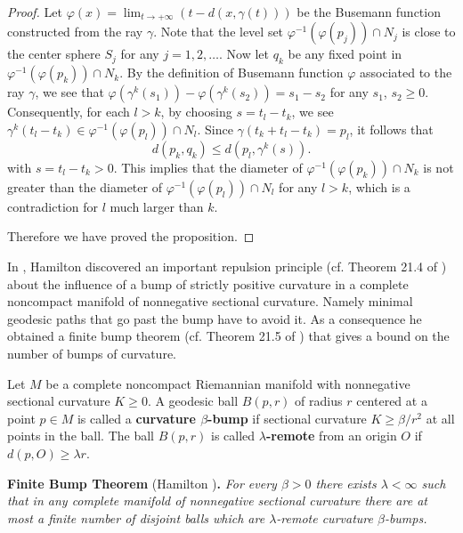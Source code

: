 \begin{proof}
Let $\varphi(x)=\lim_{t\rightarrow+\infty}(t-d(x,\gamma(t)))$ be
the Busemann function constructed from the ray $\gamma$. Note that
the level set $\varphi^{-1}(\varphi(p_{j}))\cap N_j$ is close to
the center sphere $S_j$ for any $j = 1, 2, \ldots$. Now let $q_k$
be any fixed point in $\varphi^{-1}(\varphi(p_{k}))\cap N_k$. By
the definition of Busemann function $\varphi$ associated to the
ray $\gamma$, we see that
$\varphi(\gamma^{k}(s_1))-\varphi(\gamma^{k}(s_2))=s_1-s_2$ for
any $s_1$, $s_2\geq0$. Consequently, for each $l>k$, by choosing
$s=t_l-t_k$, we see $\gamma^{k}(t_l-t_k)\in
\varphi^{-1}(\varphi(p_{l}))\cap N_l.$ Since
$\gamma(t_k+t_l-t_k)=p_{l}$, it follows that
$$
d(p_{k},q_{k})\leq d(p_{l},\gamma^{k}(s)).
$$
with $s =t_l-t_k >0$. This implies that the diameter of
$\varphi^{-1}(\varphi(p_{k}))\cap N_k$ is not greater than the
diameter of $\varphi^{-1}(\varphi(p_{l}))\cap N_l$ for any $l>k$,
which is a contradiction for $l$ much larger than $k$.

Therefore we have proved the proposition.
\end{proof}

In \cite{Ha95F}, Hamilton discovered an important repulsion
principle (cf. Theorem 21.4 of \cite{Ha95F}) about the influence
of a bump of strictly positive curvature in a complete noncompact
manifold of nonnegative sectional curvature. Namely minimal
geodesic paths that go past the bump have to avoid it. As a
consequence he obtained a finite bump theorem (cf. Theorem 21.5 of
\cite{Ha95F}) that gives a bound on the number of bumps of
curvature.

Let $M$ be a complete noncompact Riemannian manifold with
nonnegative sectional curvature $K\ge 0$. A geodesic ball $B(p,r)$
of radius $r$ centered at a point $p\in M$ is called a {\bf
curvature $\beta$-bump} if sectional
curvature $K\ge \beta/r^2$ at all points in the ball. The ball
$B(p,r)$ is called {\bf $\lambda$-remote}
from an origin $O$ if $d(p, O)\ge \lambda r$.

\medskip
{\bf Finite Bump Theorem} (Hamilton
\cite{Ha95F}){\bf .} \emph{ For every $\beta >0$ there exists
$\lambda<\infty$ such that in any complete manifold of nonnegative
sectional curvature there are at most a finite number of disjoint
balls which are $\lambda$-remote curvature $\beta$-bumps.}

